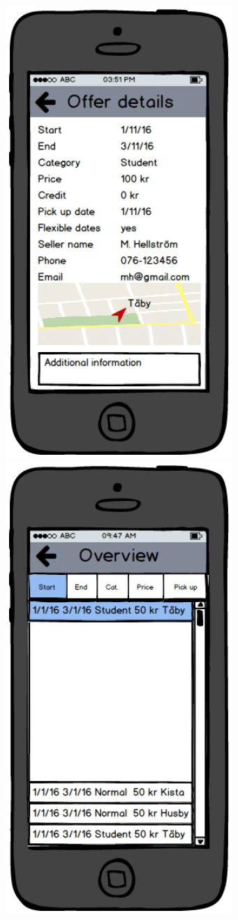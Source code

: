 \documentclass[11pt,twoside,a4paper]{report}
\begin{document}
\includegraphics[scale=0.3]{offerdetails.jpg}
\includegraphics[scale=0.3]{overview.jpg}
\end{document}
